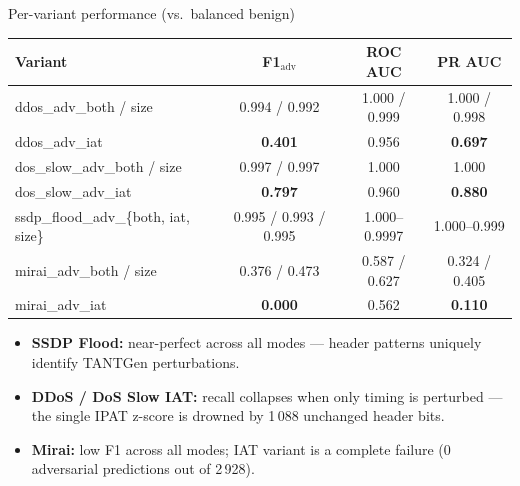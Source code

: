 \documentclass[10pt,aspectratio=169]{beamer}
\newcommand{\good}[1]{\textcolor{good}{\textbf{#1}}}
\newcommand{\warn}[1]{\textcolor{warn}{\textbf{#1}}}
\newcommand{\bad}[1]{\textcolor{bad}{\textbf{#1}}}
\begin{document}
\begin{frame}{Per-variant performance (vs.\ balanced benign)}
\centering\small
\begin{tabular}{lccc}
\toprule
\textbf{Variant} & \textbf{F1$_\text{adv}$} & \textbf{ROC AUC} & \textbf{PR AUC} \\
\midrule
\rowcolor{good!15} ddos\_adv\_both / size       & 0.994 / 0.992 & 1.000 / 0.999 & 1.000 / 0.998 \\
\rowcolor{warn!15} ddos\_adv\_iat               & \warn{0.401} & 0.956 & \warn{0.697} \\
\midrule
\rowcolor{good!15} dos\_slow\_adv\_both / size   & 0.997 / 0.997 & 1.000 & 1.000 \\
\rowcolor{warn!15} dos\_slow\_adv\_iat           & \warn{0.797} & 0.960 & \warn{0.880} \\
\midrule
\rowcolor{good!15} ssdp\_flood\_adv\_\{both, iat, size\} & 0.995 / 0.993 / 0.995 & 1.000--0.9997 & 1.000--0.999 \\
\midrule
\rowcolor{warn!15} mirai\_adv\_both / size      & 0.376 / 0.473 & 0.587 / 0.627 & 0.324 / 0.405 \\
\rowcolor{bad!15}  mirai\_adv\_iat              & \bad{0.000}   & 0.562 & \bad{0.110} \\
\bottomrule
\end{tabular}

\vspace{0.5em}
\begin{itemize}\small
  \item \good{SSDP Flood:} near-perfect across all modes --- header patterns
        uniquely identify TANTGen perturbations.
  \item \warn{DDoS / DoS Slow IAT:} recall collapses when only timing
        is perturbed --- the single IPAT z-score is drowned by
        1\,088 unchanged header bits.
  \item \bad{Mirai:} low F1 across all modes; IAT variant is a
        complete failure (0 adversarial predictions out of 2\,928).
\end{itemize}
\end{frame}
\end{document}
